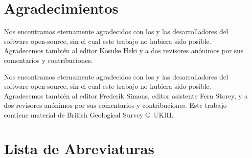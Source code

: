 \documentclass[12pt,a4paper,twoside,openright]{book}
\newcommand{\fancyfront}{%
    \fancyhf{} %
    \fancyfoot[C]{\thepage}
    \renewcommand{\headrulewidth}{0pt}
    \renewcommand{\footrulewidth}{0pt}

    \fancypagestyle{plain}{%
        \fancyhf{} %
        \fancyfoot[C]{\thepage}
        \renewcommand{\headrulewidth}{0pt}
        \renewcommand{\footrulewidth}{0pt}
    }
}
\newcommand{\fancymain}{%
    \fancyhf{} %
    \fancyhead[RO,LE]{\thepage}
    \fancyhead[RE]{\leftmark}
    \fancyhead[LO]{\nouppercase{\rightmark}}
    \renewcommand{\headrulewidth}{0.4pt}

    \fancypagestyle{plain}{%
        \fancyhf{} %
        \renewcommand{\headrulewidth}{0pt}
        \renewcommand{\footrulewidth}{0pt}
    }

}
\begin{document}
\frontmatter
\fancyfront





\chapter{Agradecimientos}

Nos encontramos eternamente agradecidos con los y las desarrolladores del
software open-source, sin el cual este trabajo no hubiera sido posible.
Agradecemos también al editor Kosuke Heki y a dos revisores anónimos por sus
comentarios y contribuciones.

Nos encontramos eternamente agradecidos con los y las desarrolladores del
software open-source, sin el cual este trabajo no hubiera sido posible.
Agradecemos también al editor Frederik Simons, editor asistente Fern Storey,
y a dos revisores anónimos por sus comentarios y contribuciones.
Este trabajo contiene material de British Geological Survey ©~UKRI.


\tableofcontents

\chapter{Lista de Abreviaturas}
\begin{acronym}
\end{acronym}


\mainmatter
\fancymain













\backmatter


\end{document}
